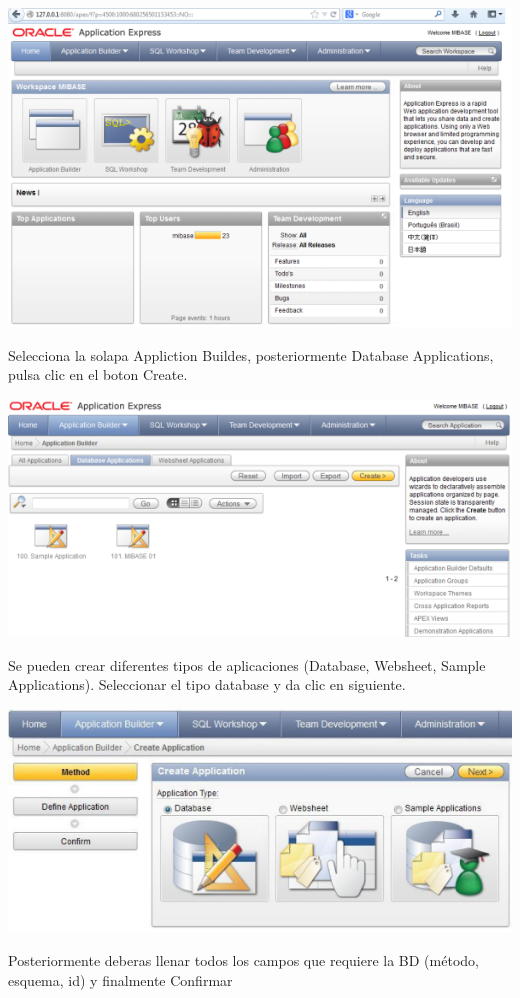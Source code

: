 \documentclass[12pt,letterpaper]{article}
\begin{document}
\begin{center}
\includegraphics[width=15cm]{./IMG/img10}
\end{center}
Selecciona la solapa Appliction Buildes, posteriormente Database Applications,
pulsa clic en el boton Create. 
\begin{center}
\includegraphics[width=15cm]{./IMG/img11}
\end{center}
Se pueden crear diferentes tipos de aplicaciones (Database, Websheet, Sample
Applications). Seleccionar el tipo database y da clic en siguiente.

\begin{center}
\includegraphics[width=15cm]{./IMG/img12}
\end{center}
Posteriormente deberas llenar todos los campos que requiere la BD (m\'etodo,
esquema, id) y finalmente Confirmar
\end{document}
